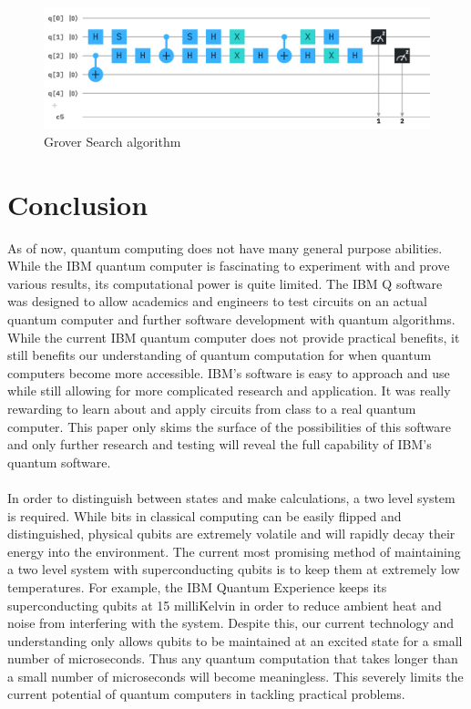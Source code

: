 \documentclass[12pt]{article}
\begin{document}
\begin{figure}[ht]
\begin{minipage}{0.35\linewidth}
            \end{minipage}%
            \begin{minipage}{0.65\linewidth}
                \includegraphics[width=\linewidth]{Circuits/grover.png}
            \end{minipage}
            \caption{Grover Search algorithm}
        \end{figure}
    
\section{Conclusion}
    As of now, quantum computing does not have many general purpose abilities. While the IBM quantum computer is fascinating to experiment with and prove various results, its computational power is quite limited. The IBM Q software was designed to allow academics and engineers to test circuits on an actual quantum computer and further software development with quantum algorithms. While the current IBM quantum computer does not provide practical benefits, it still benefits our understanding of quantum computation for when quantum computers become more accessible. IBM's software is easy to approach and use while still allowing for more complicated research and application. It was really rewarding to learn about and apply circuits from class to a real quantum computer. This paper only skims the surface of the possibilities of this software and only further research and testing will reveal the full capability of IBM's quantum software.
    \\
    \smallskip
    \\
    In order to distinguish between states and make calculations, a two level system is required. While bits in classical computing can be easily flipped and distinguished, physical qubits are extremely volatile and will rapidly decay their energy into the environment. The current most promising method of maintaining a two level system with superconducting qubits is to keep them at extremely low temperatures. For example, the IBM Quantum Experience keeps its superconducting qubits at 15 milliKelvin in order to reduce ambient heat and noise from interfering with the system. Despite this, our current technology and understanding only allows qubits to be maintained at an excited state for a small number of microseconds. Thus any quantum computation that takes longer than a small number of microseconds will become meaningless. This severely limits the current potential of quantum computers in tackling practical problems.
\end{document}
